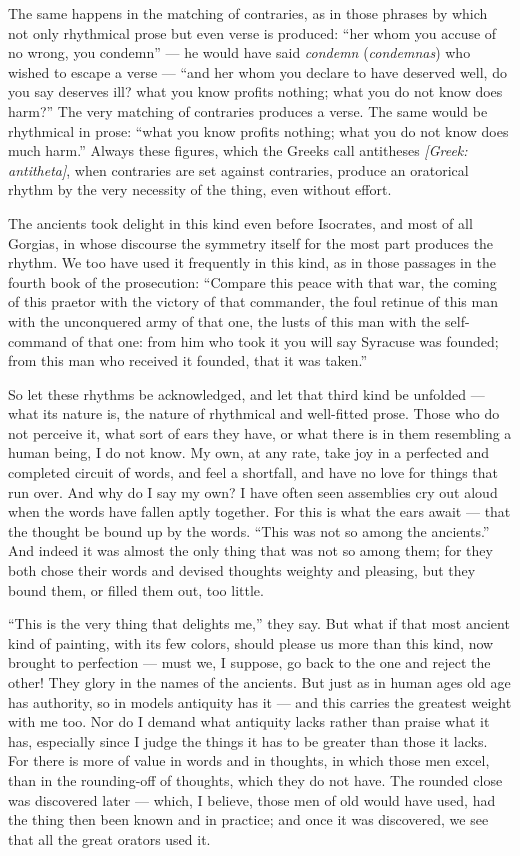  The same happens in the matching of contraries, as in those phrases by which not only rhythmical prose but even verse is produced: ``her whom you accuse of no wrong, you condemn'' — he would have said \textit{condemn} (\textit{condemnas}) who wished to escape a verse — ``and her whom you declare to have deserved well, do you say deserves ill? what you know profits nothing; what you do not know does harm?'' The very matching of contraries produces a verse. The same would be rhythmical in prose: ``what you know profits nothing; what you do not know does much harm.'' Always these figures, which the Greeks call antitheses \textit{[Greek: antitheta]}, when contraries are set against contraries, produce an oratorical rhythm by the very necessity of the thing, even without effort.

 The ancients took delight in this kind even before Isocrates, and most of all Gorgias, in whose discourse the symmetry itself for the most part produces the rhythm. We too have used it frequently in this kind, as in those passages in the fourth book of the prosecution: ``Compare this peace with that war, the coming of this praetor with the victory of that commander, the foul retinue of this man with the unconquered army of that one, the lusts of this man with the self-command of that one: from him who took it you will say Syracuse was founded; from this man who received it founded, that it was taken.''

 So let these rhythms be acknowledged, and let that third kind be unfolded — what its nature is, the nature of rhythmical and well-fitted prose. Those who do not perceive it, what sort of ears they have, or what there is in them resembling a human being, I do not know. My own, at any rate, take joy in a perfected and completed circuit of words, and feel a shortfall, and have no love for things that run over. And why do I say my own? I have often seen assemblies cry out aloud when the words have fallen aptly together. For this is what the ears await — that the thought be bound up by the words. ``This was not so among the ancients.'' And indeed it was almost the only thing that was not so among them; for they both chose their words and devised thoughts weighty and pleasing, but they bound them, or filled them out, too little.

 ``This is the very thing that delights me,'' they say. But what if that most ancient kind of painting, with its few colors, should please us more than this kind, now brought to perfection — must we, I suppose, go back to the one and reject the other! They glory in the names of the ancients. But just as in human ages old age has authority, so in models antiquity has it — and this carries the greatest weight with me too. Nor do I demand what antiquity lacks rather than praise what it has, especially since I judge the things it has to be greater than those it lacks. For there is more of value in words and in thoughts, in which those men excel, than in the rounding-off of thoughts, which they do not have. The rounded close was discovered later — which, I believe, those men of old would have used, had the thing then been known and in practice; and once it was discovered, we see that all the great orators used it.

